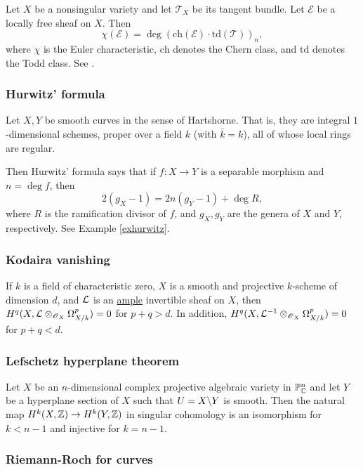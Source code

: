 \documentclass[11pt, english]{article}
\begin{document}
Let $X$ be a nonsingular variety and let $\mathscr T_X$ be its tangent bundle. Let $\mathscr E$ be a locally free sheaf on $X$. Then
\[
\chi(\mathscr E) = \deg {\left( \mathrm{ch}(\mathscr E) \cdot \mathrm{td}(\mathscr T) \right)}_{n},
\]
where $\chi$ is the Euler characteristic, $\mathrm{ch}$ denotes the Chern class, and $\mathrm{td}$ denotes the Todd class. See \cite[Appendix A]{hartshorne}.

\subsubsection{Hurwitz' formula}
\label{hurwitzformula}

Let $X,Y$ be smooth curves in the sense of Hartshorne. That is, they are integral $1$-dimensional schemes, proper over a field $k$ (with $\bar k = k$), all of whose local rings are regular.

Then Hurwitz' formula says that if $f:X \to Y$ is a separable morphism and $n= \deg f$, then
\[
2(g_X-1) = 2n(g_Y-1) + \deg R,
\]
where $R$ is the ramification divisor of $f$, and $g_X,g_Y$ are the genera of $X$ and $Y$, respectively. See Example \ref{exhurwitz}. 

\subsubsection{Kodaira vanishing}
\label{kodairavanishing}
If $k$ is a field of characteristic zero, $X$ is a smooth and projective $k$-scheme of dimension $d$, and $\mathcal{L}$ is an \hyperref[amplelinebundle]{ample} invertible sheaf on $X$, then ${H^q(X,{\mathcal{L} \otimes_{\operatorname{\mathscr{O}}_X} \Omega^p_{X/k}})=0}$ for $p+q > d$. In addition, $H^q(X,\mathcal{L}^{-1} \otimes_{\operatorname{\mathscr{O}}_X} \Omega_{X/k}^p)=0$ for $p+q < d$. 

\subsubsection{Lefschetz hyperplane theorem}
\label{lefschetz} 
Let $X$ be an $n$-dimensional complex projective algebraic variety in $\mathbb{P}_{\mathbb{C}}^n$ and let $Y$ be a hyperplane section of $X$ such that $U=X \backslash Y$ is smooth. Then the natural map $H^k(X,\mathbb{Z}) \to H^k(Y,\mathbb{Z})$ in singular cohomology is an isomorphism for $k<n-1$ and injective for $k=n-1$.

\subsubsection{Riemann-Roch for curves}
\label{riemannroch}
\end{document}

